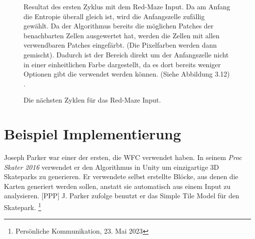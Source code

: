 \documentclass[12pt, a4paper,twoside,openright]{report}
\begin{document}
\begin{figure}[H]
    \centering
    \caption{
        Resultat des ersten Zyklus mit dem Red-Maze Input. Da am Anfang die Entropie überall gleich ist, wird die Anfangszelle zufällig gewählt.
        Da der Algorithmus bereits die möglichen Patches der benachbarten Zellen ausgewertet hat, werden die Zellen mit allen verwendbaren Patches eingefärbt.
        {(Die Pixelfarben werden dann gemischt)}.
        Dadurch ist der Bereich direkt um der Anfangszelle nicht in einer einheitlichen Farbe dargestellt, da es dort bereits weniger Optionen gibt die verwendet werden können.
        {(Siehe Abbildung 3.12)} \cite{Karth2017WaveFunctionCollapseIC}.
    }%
\end{figure}

\begin{figure}[H]
    \centering
    \caption{Die nächsten Zyklen für das Red-Maze Input. \cite{Karth2017WaveFunctionCollapseIC}}%
\end{figure}

\section{Beispiel Implementierung}

Joseph Parker war einer der ersten, die WFC verwendet haben.
In seinem \textit{Proc Skater 2016} verwendet er den Algorithmus in Unity um einzigartige 3D Skateparks zu generieren.
Er verwendete selbst erstellte Blöcke, aus denen die Karten generiert werden sollen, anstatt sie automatisch aus einem Input zu analysieren. {[PPP]}
J. Parker zufolge benutzt er das Simple Tile Model für den Skatepark. \footnote[5]{Persönliche Kommunikation, 23. Mai 2023}
\end{document}
